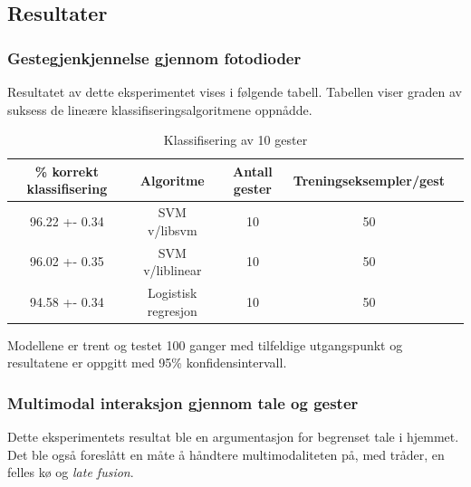 \subsection{Resultater}
\subsubsection*{Gestegjenkjennelse gjennom fotodioder}
Resultatet av dette eksperimentet vises i følgende tabell. Tabellen viser graden av suksess de lineære klassifiseringsalgoritmene oppnådde.
\begin{table}[h!]
\centering
\begin{tabular}{|| c c c c c ||}
\hline
\% korrekt klassifisering & Algoritme & Antall gester & Treningseksempler/gest \\ [0.5ex] 
 \hline\hline
 96.22 +- 0.34 & SVM v/libsvm & 10 & 50 \\ 
 \hline
 96.02 +- 0.35 & SVM v/liblinear & 10 & 50 \\
 \hline
 94.58 +- 0.34 & Logistisk regresjon & 10 & 50 \\
 \hline
\end{tabular}
\caption{Klassifisering av 10 gester}
\label{table:results}
\end{table}
Modellene er trent og testet 100 ganger med tilfeldige utgangspunkt og resultatene er oppgitt med 95\% konfidensintervall.\\

\subsubsection*{Multimodal interaksjon gjennom tale og gester}
Dette eksperimentets resultat ble en argumentasjon for begrenset tale i hjemmet. Det ble også foreslått en måte å håndtere multimodaliteten på, med tråder, en felles kø og \emph{late fusion}.

